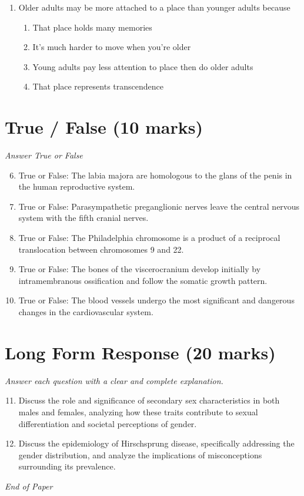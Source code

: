 \documentclass[12pt]{article}
\begin{document}
\begin{enumerate}[label=\arabic*.]
\begin{enumerate}[label=(\alph*)]
    \item The steadily increasing birth rate
    \item Increases in life expectancy at birth
    \item Increases in life expectancy at a specified age
\end{enumerate}
\item Older adults may be more attached to a place than younger adults because
\begin{enumerate}[label=(\alph*)]
    \item That place holds many memories
    \item It's much harder to move when you're older
    \item Young adults pay less attention to place then do older adults
    \item That place represents transcendence
\end{enumerate}
\end{enumerate}

\section*{True / False (10 marks)}
\textit{Answer True or False}
\begin{enumerate}[label=\arabic*.]
\setcounter{enumi}{5}
\item True or False: The labia majora are homologous to the glans of the penis in the human reproductive system.
\item True or False: Parasympathetic preganglionic nerves leave the central nervous system with the fifth cranial nerves.
\item True or False: The Philadelphia chromosome is a product of a reciprocal translocation between chromosomes 9 and 22.
\item True or False: The bones of the viscerocranium develop initially by intramembranous ossification and follow the somatic growth pattern.
\item True or False: The blood vessels undergo the most significant and dangerous changes in the cardiovascular system.
\end{enumerate}

\section*{Long Form Response (20 marks)}
\textit{Answer each question with a clear and complete explanation.}
\begin{enumerate}[label=\arabic*.]
\setcounter{enumi}{10}
\item Discuss the role and significance of secondary sex characteristics in both males and females, analyzing how these traits contribute to sexual differentiation and societal perceptions of gender.
\item Discuss the epidemiology of Hirschsprung disease, specifically addressing the gender distribution, and analyze the implications of misconceptions surrounding its prevalence.
\end{enumerate}

\vfill
\noindent\textit{End of Paper}
\end{document}
